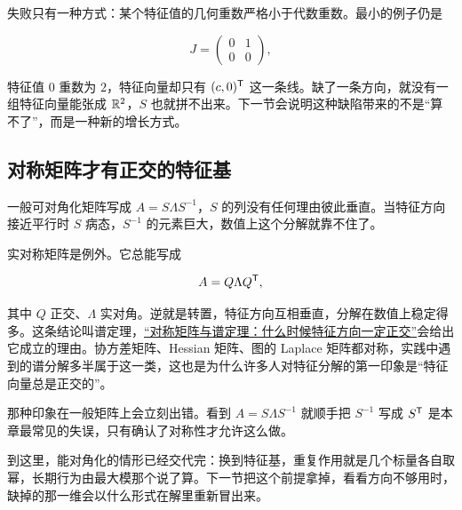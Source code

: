 失败只有一种方式：某个特征值的几何重数严格小于代数重数。最小的例子仍是

\[
J=\begin{pmatrix}0&1\\0&0\end{pmatrix},
\]

特征值 \(0\) 重数为 \(2\)，特征向量却只有 \((c,0)^{\mathsf{T}}\) 这一条线。缺了一条方向，就没有一组特征向量能张成 \(\mathbb{R}^2\)，\(S\) 也就拼不出来。下一节会说明这种缺陷带来的不是``算不了''，而是一种新的增长方式。

\subsection{对称矩阵才有正交的特征基}

一般可对角化矩阵写成 \(A=S\Lambda S^{-1}\)，\(S\) 的列没有任何理由彼此垂直。当特征方向接近平行时 \(S\) 病态，\(S^{-1}\) 的元素巨大，数值上这个分解就靠不住了。

实对称矩阵是例外。它总能写成

\[
A=Q\Lambda Q^{\mathsf{T}},
\]

其中 \(Q\) 正交、\(\Lambda\) 实对角。逆就是转置，特征方向互相垂直，分解在数值上稳定得多。这条结论叫谱定理，\hyperref[sec:03-Linear-Algebra/06-Symmetric-and-Positive-Definite-Matrices/01]{``对称矩阵与谱定理：什么时候特征方向一定正交''}会给出它成立的理由。协方差矩阵、Hessian 矩阵、图的 Laplace 矩阵都对称，实践中遇到的谱分解多半属于这一类，这也是为什么许多人对特征分解的第一印象是``特征向量总是正交的''。

那种印象在一般矩阵上会立刻出错。看到 \(A=S\Lambda S^{-1}\) 就顺手把 \(S^{-1}\) 写成 \(S^{\mathsf{T}}\) 是本章最常见的失误，只有确认了对称性才允许这么做。

到这里，能对角化的情形已经交代完：换到特征基，重复作用就是几个标量各自取幂，长期行为由最大模那个说了算。下一节把这个前提拿掉，看看方向不够用时，缺掉的那一维会以什么形式在解里重新冒出来。
